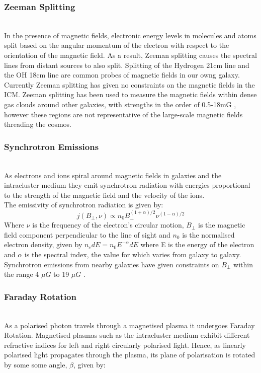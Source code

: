 \subsubsection*{Zeeman Splitting}
\\
In the presence of magnetic fields, electronic energy levels in molecules and atoms split based on the angular momentum of the electron with respect to the orientation of the magnetic field. As a result, Zeeman splitting causes the spectral lines from distant sources to also split. Splitting of the Hydrogen 21cm line and the OH 18cm line are common probes of magnetic fields in our owng galaxy. Currently Zeeman splitting has given no constraints on the magnetic fields in the ICM. Zeeman splitting has been used to measure the magnetic fields within dense gas clouds around other galaxies, with strengths in the order of 0.5-18mG \cite{Robishaw:2008ti}, however these regions are not representative of the large-scale magnetic fields threading the cosmos.
\subsubsection*{Synchrotron Emissions}
\\
As electrons and ions spiral around magnetic fields in galaxies and the intracluster medium they emit synchrotron radiation with energies proportional to the strength of the magnetic field and the velocity of the ions.
\\
The emissivity of synchrotron radiation is given by:
\begin{equation}
j(B_{\bot},\nu) \propto n_0 B_{\bot}^{(1+\alpha)/2} \nu ^{(1-\alpha)/2}
\end{equation}
Where $\nu$ is the frequency of the electron's circular motion, $B_{\bot}$ is the magnetic field component perpendicular to the line of sight and $n_0$ is the normalised electron density, given by $n_e dE = n_0 E^{-\alpha} dE$ where E is the energy of the electron and $\alpha$ is the spectral index, the value for which varies from galaxy to galaxy.
\\
Synchrotron emissions from nearby galaxies have given constraints on $B_{\bot}$ within the range 4 $\mu G$ to 19 $\mu G$ \cite{Giovannini:2003yn}.
\subsubsection*{Faraday Rotation}
\\
As a polarised photon travels through a magnetised plasma it undergoes Faraday Rotation. Magnetised plasmas such as the intracluster medium exhibit different refractive indices for left and right circularly polarised light. Hence, as linearly polarised light propagates through the plasma, its plane of polarisation is rotated by some some angle, $\beta$, given by:

